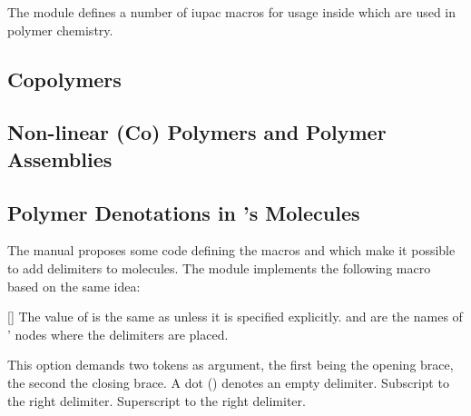 \documentclass{chemmacros-manual}
\begin{document}
The  module defines a number of \ac{iupac} macros for
usage inside  which are used in polymer chemistry.

\subsection{Copolymers}
\begin{commands}
\end{commands}

\subsection{Non-linear (Co) Polymers and Polymer Assemblies}
\begin{commands}
\end{commands}

\subsection{Polymer Denotations in 's Molecules}
The  manual proposes some code defining the macros
 and  which make it possible to add
delimiters to  molecules.  The  module
implements the following macro based on the same idea:
\begin{commands}
  []
    The value of  is the same as  unless it is
    specified explicitly.   and  are the
    names of \TikZ' nodes where the delimiters are placed.
\end{commands}
\begin{options}
  \Initial{[]}
    This option demands two tokens as argument, the first being the opening
    brace, the second the closing brace.  A dot () denotes an empty
    delimiter.
    Subscript to the right delimiter.
    Superscript to the right delimiter.
\end{options}
\end{document}
